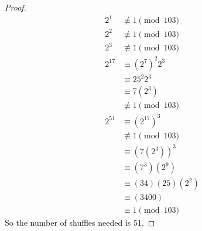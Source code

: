 \documentclass{article}
\begin{document}
\begin{proof}
	\begin{align*}
		2^{1} &\not\equiv 1 \pmod{103} \\
		2^{2} &\not\equiv 1 \pmod{103} \\
		2^{3} &\not\equiv 1 \pmod{103} \\
		2^{17} &\equiv (2^{7})^{2}2^{3} \\
		       &\equiv 25^{2}2^{3} \\
		       &\equiv 7(2^{3}) \\
		       &\not\equiv 1 \pmod{103} \\
		2^{51} &\equiv (2^{17})^{3} \\
		       &\not\equiv 1 \pmod{103} \\
		       &\equiv (7(2^{3}))^{3} \\
		       &\equiv (7^{3})(2^{9}) \\
		       &\equiv (34)(25)(2^{2}) \\
		       &\equiv (3400) \\
		       &\equiv 1 \pmod{103}
	\end{align*}
	So the number of shuffles needed is 51.
\end{proof}
\end{document}
